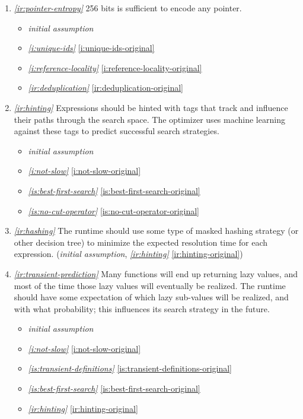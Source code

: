\documentclass{report}
\makeatletter
\newcommand*{\Label}[2]{%
  \@bsphack
  \begingroup
    \label{#1-original}%
    \def\@currentlabel{#2}%
    \label{#1}%
  \endgroup
  \@esphack
}
\newcommand{\initial}{{\em initial assumption}}
\newcommand{\refboth}[1]{{\em \ref{#1}} \ref{#1-original}}
\makeatother
\begin{document}
\begin{enumerate}
  affinity (apropos of \refboth{i:reference-locality}).
\begin{itemize}
\item \refboth{i:xh-heap}
\item \refboth{ir:static-inlining}
\item \refboth{ir:expression-representation}
\item \refboth{ir:hinting}
\end{itemize}
\item{}\Label{ir:pointer-entropy}{xhr.pointerentropy}{\em\ref{ir:pointer-entropy}}
  256 bits is sufficient to encode any pointer.
\begin{itemize}
\item \initial
\item \refboth{i:unique-ids}
\item \refboth{i:reference-locality}
\item \refboth{ir:deduplication}
\end{itemize}

\item{}\Label{ir:hinting}{xhr.hinting}{\em\ref{ir:hinting}}
  Expressions should be hinted with tags that track and influence their
  paths through the search space. The optimizer uses machine learning
  against these tags to predict successful search strategies.
\begin{itemize}
\item \initial
\item \refboth{i:not-slow}
\item \refboth{is:best-first-search}
\item \refboth{is:no-cut-operator}
\end{itemize}
\item{}\Label{ir:hashing}{xhr.hashing}{\em\ref{ir:hashing}}
  The runtime should use some type of masked hashing strategy (or other
  decision tree) to minimize the expected resolution time for each
  expression.
(\initial, \refboth{ir:hinting})
\item{}\Label{ir:transient-prediction}{xhr.transientprediction}{\em\ref{ir:transient-prediction}}
  Many functions will end up returning lazy values, and most of the time
  those lazy values will eventually be realized. The runtime should have
  some expectation of which lazy sub-values will be realized, and with what
  probability; this influences its search strategy in the future.
\begin{itemize}
\item \initial
\item \refboth{i:not-slow}
\item \refboth{is:transient-definitions}
\item \refboth{is:best-first-search}
\item \refboth{ir:hinting}
\end{itemize}


\end{enumerate}
\end{document}
